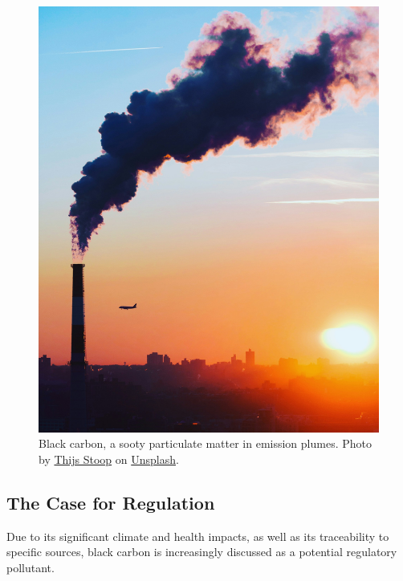 \documentclass[
  letterpaper,
  DIV=11,
  numbers=noendperiod]{scrartcl}
\begin{document}
\begin{figure}[H]

{\centering \includegraphics[width=6.4in,height=\textheight]{img/thijs-stoop-A_AQxGz9z5I-unsplash.jpg}

}

\caption{Black carbon, a sooty particulate matter in emission plumes.
Photo by
\href{https://unsplash.com/photos/white-smoke-A_AQxGz9z5I}{Thijs Stoop}
on \href{https://unsplash.com/}{Unsplash}.}

\end{figure}%

\subsection{The Case for Regulation}\label{the-case-for-regulation}

Due to its significant climate and health impacts, as well as its
traceability to specific sources, black carbon is increasingly discussed
as a potential regulatory pollutant.
\end{document}
